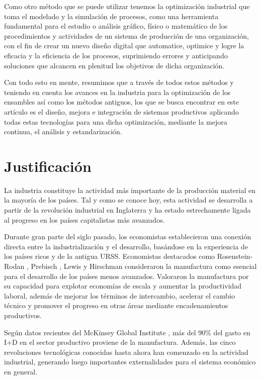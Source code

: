     
    Como otro método que se puede utilizar tenemos la optimización industrial que toma el modelado y la simulación de procesos, como una herramienta fundamental para el estudio o análisis gráfico, físico o matemático de los procedimientos y actividades de un sistema de producción de una organización, con el fin de crear un nuevo diseño digital que automatice, optimice y logre la eficacia y la eficiencia de los procesos, suprimiendo errores y anticipando soluciones que alcancen en plenitud los objetivos de dicha organización. \cite{sanchez2015analisis}
    
    Con todo esto en mente, resumimos que a través de todos estos métodos y teniendo en cuenta los avances en la industria para la optimización de los ensambles así como los métodos antiguos, los que se busca encontrar en este artículo es el diseño, mejora e integración de sistemas productivos aplicando todas estas tecnologías para una dicha optimización, mediante la mejora continua, el análisis y estandarización.
    
    
    \section{Justificación}
    
    La industria constituye la actividad más importante de la producción material en la mayoría de los países. Tal y como se conoce hoy, esta actividad se desarrolla a partir de la revolución industrial en Inglaterra y ha estado estrechamente ligada al progreso en los países capitalistas más avanzados.
    
    Durante gran parte del siglo pasado, los economistas establecieron una conexión directa entre la industrialización y el desarrollo, basándose en la experiencia de los países ricos y de la antigua URSS. Economistas destacados como Rosenstein-Rodan \cite{Paul}, Prebisch \cite{Prebisch}, Lewis \cite{Lewis} y Hirschman \cite{hirschman2012rise} consideraron la manufactura como esencial para el desarrollo de los países menos avanzados. Valoraron la manufactura por su capacidad para explotar economías de escala y aumentar la productividad laboral, además de mejorar los términos de intercambio, acelerar el cambio técnico y promover el progreso en otras áreas mediante encadenamientos productivos.
    
    Según datos recientes del McKinsey Global Institute \cite{McKinsey}, más del 90\% del gasto en I+D en el sector productivo proviene de la manufactura. Además, las cinco revoluciones tecnológicas conocidas hasta ahora han comenzado en la actividad industrial, generando luego importantes externalidades para el sistema económico en general.
    
